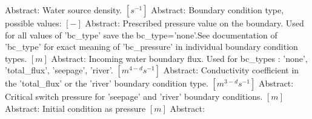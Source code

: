 \begin{RecordType}
		\KeyItem
			{}
			{{Abstract}{: }}
			{\textrangle}
			{} %
			{{{Water source density. }{$[s^{-1}]$}}}
		\KeyItem
			{}
			{{Abstract}{: }}
			{\textrangle}
			{} %
			{{{Boundary condition type, possible values: }{$[-]$}}}
		\KeyItem
			{}
			{{Abstract}{: }}
			{\textrangle}
			{} %
			{{{Prescribed pressure value on the boundary. Used for all values of 'bc{\_}type' save the bc{\_}type='none'.See documentation of 'bc{\_}type' for exact meaning of 'bc{\_}pressure' in individual boundary condition types. }{$[m]$}}}
		\KeyItem
			{}
			{{Abstract}{: }}
			{\textrangle}
			{} %
			{{{Incoming water boundary flux. Used for bc{\_}types : 'none', 'total{\_}flux', 'seepage', 'river'. }{$[m^{4-d}s^{-1}]$}}}
		\KeyItem
			{}
			{{Abstract}{: }}
			{\textrangle}
			{} %
			{{{Conductivity coefficient in the 'total{\_}flux' or the 'river' boundary condition type. }{$[m^{3-d}s^{-1}]$}}}
		\KeyItem
			{}
			{{Abstract}{: }}
			{\textrangle}
			{} %
			{{{Critical switch pressure for 'seepage' and 'river' boundary conditions. }{$[m]$}}}
		\KeyItem
			{}
			{{Abstract}{: }}
			{\textrangle}
			{} %
			{{{Initial condition as pressure }{$[m]$}}}
		\KeyItem
			{}
			{{Abstract}{: }}
			{\textrangle}

\end{RecordType}
